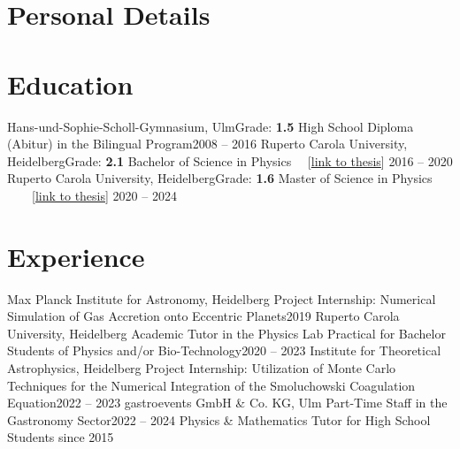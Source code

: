 \documentclass{cv}
\begin{document}
    \header
        \section{Personal Details}
        \personalDetails
        \section{Education}\vspace*{1mm}
        \resumeSubHeadingListStart
            \resumeSubheading
                {Hans-und-Sophie-Scholl-Gymnasium\textnormal{, Ulm}}{Grade: \textbf{1.5}}
                {High School Diploma (Abitur) in the Bilingual Program}{2008 -- 2016}
            \resumeSubheading
                {Ruperto Carola University\textnormal{, Heidelberg}}{Grade: \textbf{2.1}}
                {Bachelor of Science in Physics 
                    \ \ [\href{https://fs.mader.xyz/pdf/theses/bsc-thesis.pdf}{link to thesis}]
                }{2016 -- 2020}
            \resumeSubheading
                {Ruperto Carola University\textnormal{, Heidelberg}}{Grade: \textbf{1.6}}
                {Master of Science in Physics
                    \ \ \ \ [\href{https://fs.mader.xyz/pdf/theses/msc-thesis.pdf}{link to thesis}]
                }{2020 -- 2024}
        \resumeSubHeadingListEnd\vspace*{1mm}
        \section{Experience}\vspace*{1mm}
        \resumeSubHeadingListStart
            \resumeSubheading
                {Max Planck Institute for Astronomy\textnormal{, Heidelberg}}{}
                {Project Internship: Numerical Simulation of Gas Accretion onto Eccentric Planets}{2019}
            \resumeSubheading
                {Ruperto Carola University\textnormal{, Heidelberg}}{}
                {Academic Tutor in the Physics Lab Practical for Bachelor Students of Physics and/or
                Bio-Technology}{2020 -- 2023}
            \resumeSubheading
                {Institute for Theoretical Astrophysics\textnormal{, Heidelberg}}{}
                {Project Internship: Utilization of Monte Carlo Techniques for the 
                 Numerical Integration of the Smoluchowski Coagulation Equation}{2022 -- 2023}
            \resumeSubheading
                {gastroevents GmbH \& Co. KG\textnormal{, Ulm}}{}
                {Part-Time Staff in the Gastronomy Sector}{2022 -- 2024}
            \resumeSubheading
                {Physics \& Mathematics Tutor for High School Students}{}
                {}{since 2015}\vspace*{-4mm}
        \resumeSubHeadingListEnd
\end{document}
